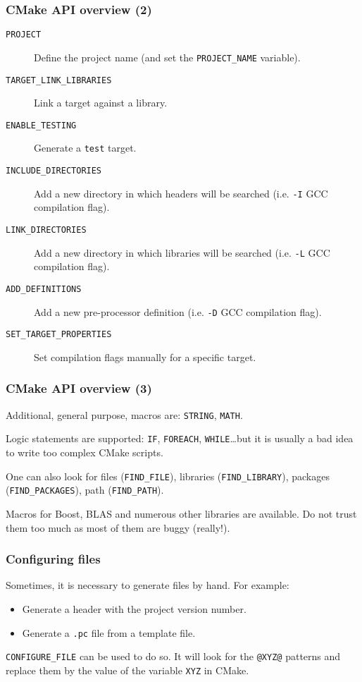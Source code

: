 \documentclass[hyperref={pdfpagelabels=false}]{beamer}
\begin{document}
\begin{frame}[fragile]
\frametitle{CMake API overview (2)}

\begin{description}
\item[\texttt{PROJECT}] Define the project name (and set the
  \texttt{PROJECT\_NAME} variable).
\item[\texttt{TARGET\_LINK\_LIBRARIES}] Link a target against a
  library.
\item[\texttt{ENABLE\_TESTING}] Generate a \texttt{test} target.
\item[\texttt{INCLUDE\_DIRECTORIES}] Add a new directory in which
  headers will be searched (i.e. \texttt{-I} GCC compilation flag).
\item[\texttt{LINK\_DIRECTORIES}] Add a new directory in which
  libraries will be searched (i.e. \texttt{-L} GCC compilation flag).
\item[\texttt{ADD\_DEFINITIONS}] Add a new pre-processor definition
  (i.e. \texttt{-D} GCC compilation flag).
\item[\texttt{SET\_TARGET\_PROPERTIES}] Set compilation flags manually
  for a specific target.
\end{description}
\end{frame}

\begin{frame}[fragile]
\frametitle{CMake API overview (3)}

Additional, general purpose, macros are: \texttt{STRING},
\texttt{MATH}.

\vspace{0.3cm}

Logic statements are supported: \texttt{IF}, \texttt{FOREACH},
\texttt{WHILE}\ldots but it is usually a bad idea to write too complex
CMake scripts.

\vspace{0.3cm}

One can also look for files (\texttt{FIND\_FILE}), libraries
(\texttt{FIND\_LIBRARY}), packages (\texttt{FIND\_PACKAGES}), path
(\texttt{FIND\_PATH}).

\vspace{0.3cm}

Macros for Boost, BLAS and numerous other libraries are available. Do
not trust them too much as most of them are buggy (really!).

\end{frame}


\begin{frame}[fragile]
\frametitle{Configuring files}

Sometimes, it is necessary to generate files by hand. For example:
\begin{itemize}
\item Generate a header with the project version number.
\item Generate a \texttt{.pc} file from a template file.
\end{itemize}

\texttt{CONFIGURE\_FILE} can be used to do so. It will look for the
\texttt{@XYZ@} patterns and replace them by the value of the variable
\texttt{XYZ} in CMake.

\end{frame}
\end{document}
